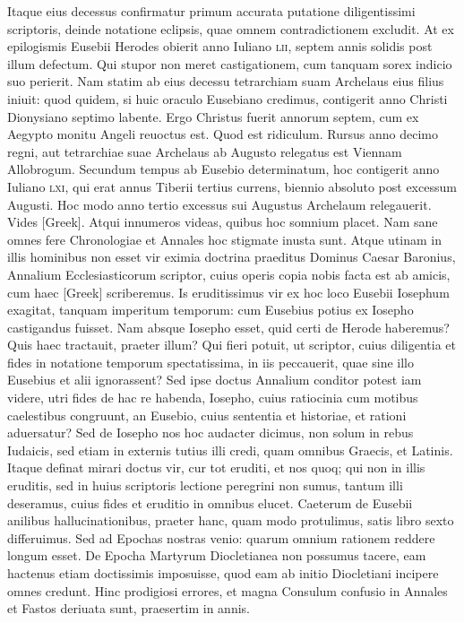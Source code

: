 Itaque eius decessus confirmatur primum accurata putatione
diligentissimi scriptoris, deinde notatione eclipsis, quae omnem contradictionem
excludit.
At ex epilogismis Eusebii Herodes obierit
anno Iuliano \textsc{lii}, septem annis solidis post illum defectum.
Qui stupor non meret castigationem, cum tanquam sorex indicio
 suo perierit.
Nam statim ab eius decessu tetrarchiam suam Archelaus eius filius
iniuit: quod quidem, si huic oraculo Eusebiano credimus, contigerit
anno Christi Dionysiano septimo labente.
Ergo Christus fuerit
annorum septem, cum ex Aegypto monitu Angeli reuoctus est.
Quod est ridiculum.
Rursus anno decimo regni, aut tetrarchiae suae
Archelaus ab Augusto relegatus est Viennam Allobrogum.
Secundum tempus ab Eusebio determinatum, hoc contigerit anno Iuliano
\textsc{lxi}, qui erat annus Tiberii tertius currens, biennio absoluto
post excessum Augusti.
Hoc modo anno tertio excessus sui Augustus
Archelaum relegauerit.
Vides \textgreek{[Greek]}.
Atqui innumeros videas,
quibus hoc somnium placet.
Nam sane omnes fere Chronologiae
et Annales hoc stigmate inusta sunt.
Atque utinam in illis hominibus
non esset vir eximia doctrina praeditus Dominus Caesar Baronius,
Annalium Ecclesiasticorum scriptor, cuius operis copia nobis
facta est ab amicis, cum haec \textgreek{[Greek]} scriberemus.
Is eruditissimus
vir ex hoc loco Eusebii Iosephum exagitat, tanquam imperitum
temporum: cum Eusebius potius ex Iosepho castigandus fuisset.
Nam absque Iosepho esset, quid certi de Herode haberemus?
Quis haec tractauit, praeter illum?
Qui fieri potuit, ut scriptor, cuius diligentia
et fides in notatione temporum spectatissima, in iis peccauerit,
quae sine illo Eusebius et alii ignorassent?
Sed ipse doctus Annalium
conditor potest iam videre, utri fides de hac re habenda, Iosepho,
cuius ratiocinia cum motibus caelestibus congruunt, an Eusebio,
cuius sententia et historiae, et rationi aduersatur?
Sed de Iosepho
nos hoc audacter dicimus, non solum in rebus Iudaicis, sed etiam
in externis tutius illi credi, quam omnibus Graecis, et Latinis.
Itaque
definat mirari doctus vir, cur tot eruditi, et nos quoq; qui non in illis
eruditis, sed in huius scriptoris lectione peregrini non sumus, tantum
illi deseramus, cuius fides et eruditio in omnibus elucet.
Caeterum de Eusebii anilibus hallucinationibus, praeter hanc, quam
modo protulimus, satis libro sexto differuimus.
Sed ad Epochas
nostras venio: quarum omnium rationem reddere longum esset.
De Epocha Martyrum Diocletianea non possumus tacere, eam hactenus
etiam doctissimis imposuisse, quod eam ab initio Diocletiani
incipere omnes credunt.
Hinc prodigiosi errores, et magna Consulum
confusio in Annales et Fastos deriuata sunt, praesertim in annis.


